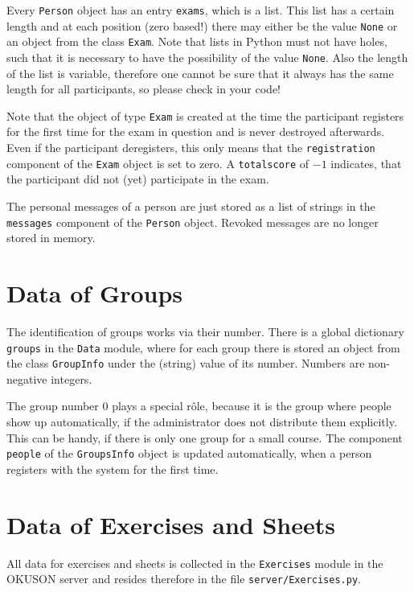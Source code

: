\documentclass[12pt,openany,a4paper]{book}
\newcommand{\OKUSON}{\textsf{OKUSON}}
\begin{document}
Every \texttt{Person} object has an entry \texttt{exams}, which is a list.
This list has a certain length and at each position (zero based!) there may
either be the value \texttt{None} or an object from the class
\texttt{Exam}. Note that lists in Python must not have holes, such that
it is necessary to have the possibility of the value \texttt{None}. Also
the length of the list is variable, therefore one cannot be sure that
it always has the same length for all participants, so please check in
your code! 

Note that the object of type \texttt{Exam} is created at the
time the participant registers for the first time for the exam in question
and is never destroyed afterwards. Even if the participant deregisters,
this only means that the \texttt{registration} component of the
\texttt{Exam} object is set to zero. A \texttt{totalscore} of $-1$
indicates, that the participant did not (yet) participate in the exam.

The personal messages of a person are just stored as a list of strings
in the \texttt{messages} component of the \texttt{Person} object. Revoked
messages are no longer stored in memory.


\section{Data of Groups}

The identification of groups works via their number. There is a global
dictionary \texttt{groups} in the \texttt{Data} module, where for each
group there is stored an object from the class \texttt{GroupInfo} under
the (string) value of its number. Numbers are non-negative integers.

The group number $0$ plays a special r\^ole, because it is the group where
people show up automatically, if the administrator does not distribute them
explicitly. This can be handy, if there is only one group for a small
course. The component \texttt{people} of the \texttt{GroupsInfo} object
is updated automatically, when a person registers with the system for the
first time.


\section{Data of Exercises and Sheets}
\label{dataex}

All data for exercises and sheets is collected in the \texttt{Exercises}
module in the {\OKUSON} server and resides therefore in the file
\texttt{server/Exercises.py}.
\end{document}
